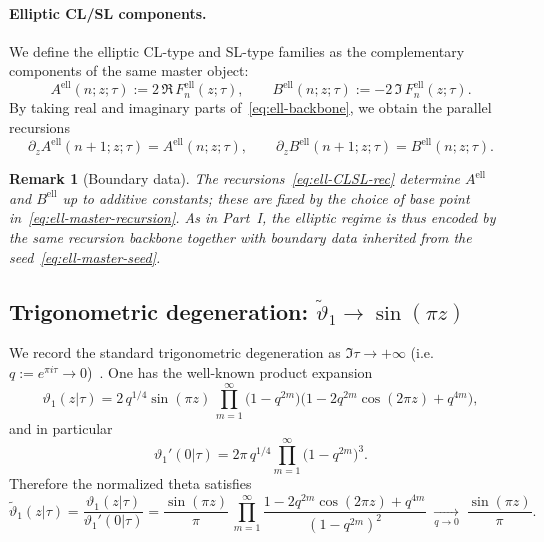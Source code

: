 \documentclass[11pt]{article}
\newtheorem{remark}{Remark}
\begin{document}
\paragraph{Elliptic CL/SL components.}
We define the elliptic CL-type and SL-type families as the complementary components
of the same master object:
\begin{equation}\label{eq:ell-CLSL-def}
A^{\mathrm{ell}}(n;z;\tau):=2\,\Re\,F^{\mathrm{ell}}_{n}(z;\tau),
\qquad
B^{\mathrm{ell}}(n;z;\tau):=-2\,\Im\,F^{\mathrm{ell}}_{n}(z;\tau).
\end{equation}
By taking real and imaginary parts of~\eqref{eq:ell-backbone}, we obtain the parallel recursions
\begin{equation}\label{eq:ell-CLSL-rec}
\partial_z A^{\mathrm{ell}}(n+1;z;\tau)=A^{\mathrm{ell}}(n;z;\tau),
\qquad
\partial_z B^{\mathrm{ell}}(n+1;z;\tau)=B^{\mathrm{ell}}(n;z;\tau).
\end{equation}

\begin{remark}[Boundary data]
The recursions~\eqref{eq:ell-CLSL-rec} determine $A^{\mathrm{ell}}$ and $B^{\mathrm{ell}}$
up to additive constants; these are fixed by the choice of base point in~\eqref{eq:ell-master-recursion}.
As in Part~I, the elliptic regime is thus encoded by the same recursion backbone together with
boundary data inherited from the seed~\eqref{eq:ell-master-seed}.
\end{remark}


\subsection{Trigonometric degeneration: $\widetilde{\vartheta}_1 \to \sin(\pi z)$}

We record the standard trigonometric degeneration as $\Im\tau\to+\infty$
(i.e.\ $q:=e^{\pi i\tau}\to 0$)~\cite{Apostol}. One has the well-known product expansion~\cite{DLMF}\cite{WhittakerWatson}\cite{Apostol}
\[
\vartheta_1(z|\tau)
=
2\,q^{1/4}\sin(\pi z)\,
\prod_{m=1}^{\infty}\bigl(1-q^{2m}\bigr)\bigl(1-2q^{2m}\cos(2\pi z)+q^{4m}\bigr),
\]
and in particular~\cite{DLMF}\cite{WhittakerWatson}
\[
\vartheta_1'(0|\tau)
=
2\pi\,q^{1/4}\prod_{m=1}^{\infty}\bigl(1-q^{2m}\bigr)^3.
\]
Therefore the normalized theta satisfies
\begin{equation}\label{eq:theta1-degeneration}
\widetilde{\vartheta}_1(z|\tau)
=
\frac{\vartheta_1(z|\tau)}{\vartheta_1'(0|\tau)}
=
\frac{\sin(\pi z)}{\pi}\,
\prod_{m=1}^{\infty}\frac{1-2q^{2m}\cos(2\pi z)+q^{4m}}{(1-q^{2m})^2}
\;\xrightarrow[q\to0]{}\;
\frac{\sin(\pi z)}{\pi}.
\end{equation}
\end{document}
